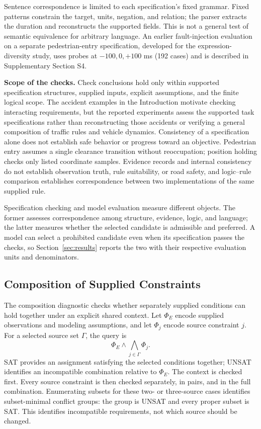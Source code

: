 Sentence correspondence is limited to each specification's fixed grammar.
Fixed patterns constrain the target, units, negation, and relation; the parser
extracts the duration and reconstructs the supported fields. This is not a
general test of semantic equivalence for arbitrary language. An earlier
fault-injection evaluation on a separate pedestrian-entry specification,
developed for the expression-diversity study, uses probes at $-100,0,+100$ ms
(192 cases) and is described in Supplementary Section S4.

\noindent\textbf{Scope of the checks.}
Check conclusions hold only within supported specification structures,
supplied inputs, explicit assumptions, and the finite logical scope. The
accident examples in the Introduction motivate checking interacting
requirements, but the reported experiments assess the supported task
specifications rather than reconstructing those accidents or verifying a
general composition of traffic rules and vehicle dynamics. Consistency of a
specification alone does not establish safe behavior or progress toward an
objective. Pedestrian entry assumes a single clearance transition without
reoccupation; position holding checks only listed coordinate samples.
Evidence records and internal consistency do not establish observation truth,
rule suitability, or road safety, and logic--rule comparison establishes
correspondence between two implementations of the same supplied rule.

Specification checking and model evaluation measure different objects. The
former assesses correspondence among structure, evidence, logic, and language;
the latter measures whether the selected candidate is admissible and
preferred. A model can select a prohibited candidate even when its
specification passes the checks, so Section~\ref{sec:results} reports the two
with their respective evaluation units and denominators.

\subsection{Composition of Supplied Constraints}\label{sec:method-composition}

The composition diagnostic checks whether separately supplied conditions can
hold together under an explicit shared context. Let $\Phi_E$ encode supplied
observations and modeling assumptions, and let $\Phi_j$ encode source
constraint $j$. For a selected source set $\Gamma$, the query is
\begin{equation}
\Phi_E\land\bigwedge_{j\in\Gamma}\Phi_j.
\end{equation}
SAT provides an assignment satisfying the selected conditions together;
UNSAT identifies an incompatible combination relative to $\Phi_E$. The context
is checked first. Every source constraint is then checked separately, in pairs,
and in the full combination. Enumerating subsets for these two- or three-source
cases identifies subset-minimal conflict groups: the group is UNSAT and every
proper subset is SAT. This identifies incompatible requirements, not which
source should be changed.

